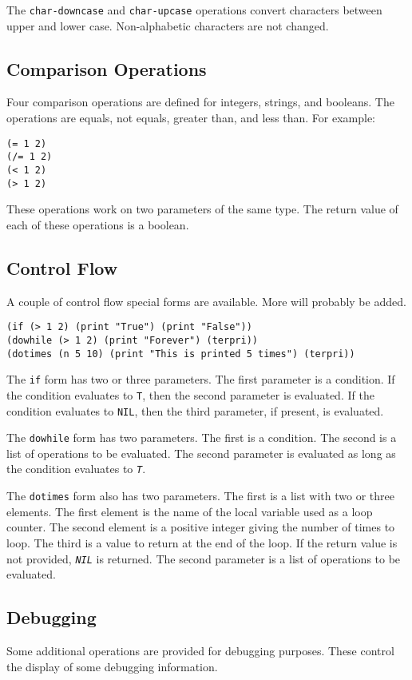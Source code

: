 \documentclass[10pt, openany]{book}
\newcommand{\function}[1]{\texttt{#1}}
\newcommand{\constant}[1]{\emph{\texttt{#1}}}
\begin{document}
The \function{char-downcase} and \function{char-upcase} operations convert characters between upper and lower case.  Non-alphabetic characters are not changed.

\subsection{Comparison Operations}
Four comparison operations are defined for integers, strings, and booleans.  The operations are equals, not equals, greater than, and less than.  For example:

\begin{lstlisting}
(= 1 2)
(/= 1 2)
(< 1 2)
(> 1 2)
\end{lstlisting}
These operations work on two parameters of the same type.  The return value of each of these operations is a boolean.

\subsection{Control Flow}
A couple of control flow special forms are available.  More will probably be added.

\begin{lstlisting}
(if (> 1 2) (print "True") (print "False"))
(dowhile (> 1 2) (print "Forever") (terpri))
(dotimes (n 5 10) (print "This is printed 5 times") (terpri))
\end{lstlisting}

The \function{if} form has two or three parameters.  The first parameter is a condition.  If the condition evaluates to \function{T}, then the second parameter is evaluated.  If the condition evaluates to \function{NIL}, then the third parameter, if present, is evaluated.

The \function{dowhile} form has two parameters.  The first is a condition.  The second is a list of operations to be evaluated.  The second parameter is evaluated as long as the condition evaluates to \constant{T}.

The \function{dotimes} form also has two parameters.  The first is a list with two or three elements.  The first element is the name of the local variable used as a loop counter.  The second element is a positive integer giving the number of times to loop.  The third is a value to return at the end of the loop.  If the return value is not provided, \constant{NIL} is returned.  The second parameter is a list of operations to be evaluated.

\subsection{Debugging}
Some additional operations are provided for debugging purposes.  These control the display of some debugging information.
\end{document}
